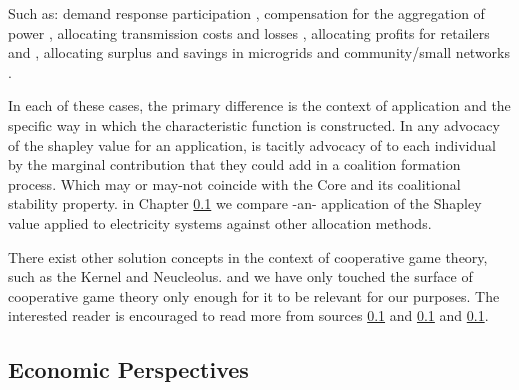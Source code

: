 Such as: demand response participation \cite{DBLP:journals/tsg/OBrienGR15,electronics8010048,WANG201972}, compensation for the aggregation of power \cite{Perez-Diaz:2018:CEV:3237383.3237484,6520960}, allocating transmission costs and losses \cite{ip-gtd_20020005,SHARMA201733}, allocating profits for retailers and \cite{ACUNA2018161,WANG201972}, allocating surplus and savings in microgrids \cite{WU2017384} and community/small networks \cite{archie_paper1,8226810,10.1007/978-3-642-40776-5_19,6840296,DBLP:journals/corr/abs-1903-10965}.

In each of these cases, the primary difference is the context of application and the specific way in which the characteristic function is constructed.
In any advocacy of the shapley value for an application, is tacitly advocacy of to each individual by the marginal contribution that they could add in a coalition formation process.
Which may or may-not coincide with the Core and its coalitional stability property.
in Chapter \ref{} we compare -an- application of the Shapley value applied to electricity systems against other allocation methods.

There exist other solution concepts in the context of cooperative game theory, such as the Kernel and Neucleolus. and we have only touched the surface of cooperative game theory only enough for it to be relevant for our purposes.
The interested reader is encouraged to read more from sources \ref{} and \ref{} and \ref{}.

\subsection{Economic Perspectives}

